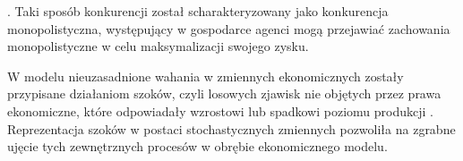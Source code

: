 . Taki sposób konkurencji został scharakteryzowany jako konkurencja monopolistyczna, występujący w gospodarce agenci mogą przejawiać zachowania monopolistyczne w celu maksymalizacji swojego zysku.

W modelu nieuzasadnione wahania w zmiennych ekonomicznych zostały przypisane działaniom szoków, czyli losowych zjawisk nie objętych przez prawa ekonomiczne, które odpowiadały wzrostowi lub spadkowi poziomu produkcji \cite{prescott_kydland}. Reprezentacja szoków w postaci stochastycznych zmiennych pozwoliła na zgrabne ujęcie tych zewnętrznych procesów w obrębie ekonomicznego modelu. 








